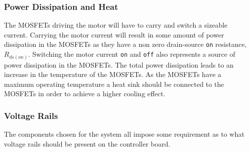 \subsubsection{Power Dissipation and Heat}
The MOSFETs driving the motor will have to carry and switch a sizeable current.
Carrying the motor current will result in some amount of power dissipation in the MOSFETs as they have a non zero drain-source \texttt{on} resistance, $R_{ds(on)}$.
Switching the motor current \texttt{on} and \texttt{off} also represents a source of power dissipation in the MOSFETs.
The total power dissipation leads to an increase in the temperature of the MOSFETs.
As the MOSFETs have a maximum operating temperature a heat sink should be connected to the MOSFETs in order to achieve a higher cooling effect.

\subsubsection{Voltage Rails}
The components chosen for the system all impose some requirement as to what voltage rails should be present on the controller board.
